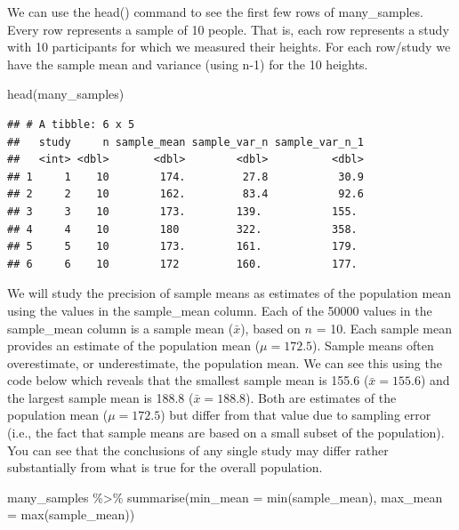 \documentclass[
]{krantz}
\makeatletter
\newenvironment{Shaded}{\begin{snugshade}}{\end{snugshade}}
\newcommand{\AttributeTok}[1]{\textcolor[rgb]{0.61,0.61,0.61}{#1}}
\newcommand{\FunctionTok}[1]{\textcolor[rgb]{0,0,0}{#1}}
\newcommand{\NormalTok}[1]{#1}
\newcommand{\SpecialCharTok}[1]{\textcolor[rgb]{0,0,0}{#1}}
\newenvironment{kframe}{%
\medskip{}
\setlength{\fboxsep}{.8em}
 \def\at@end@of@kframe{}%
 \ifinner\ifhmode%
  \def\at@end@of@kframe{\end{minipage}}%
  \begin{minipage}{\columnwidth}%
 \fi\fi%
 \def\FrameCommand##1{\hskip\@totalleftmargin \hskip-\fboxsep
 \colorbox{shadecolor}{##1}\hskip-\fboxsep
     \hskip-\linewidth \hskip-\@totalleftmargin \hskip\columnwidth}%
 \MakeFramed {\advance\hsize-\width
   \@totalleftmargin\z@ \linewidth\hsize
   \@setminipage}}%
 {\par\unskip\endMakeFramed%
 \at@end@of@kframe}
\renewenvironment{Shaded}{\begin{kframe}}{\end{kframe}}
\makeatother
\begin{document}
We can use the head() command to see the first few rows of many\_samples. Every row represents a sample of 10 people. That is, each row represents a study with 10 participants for which we measured their heights. For each row/study we have the sample mean and variance (using n-1) for the 10 heights.

\begin{Shaded}
\begin{Highlighting}[]
\FunctionTok{head}\NormalTok{(many\_samples)}
\end{Highlighting}
\end{Shaded}

\begin{verbatim}
## # A tibble: 6 x 5
##   study     n sample_mean sample_var_n sample_var_n_1
##   <int> <dbl>       <dbl>        <dbl>          <dbl>
## 1     1    10        174.         27.8           30.9
## 2     2    10        162.         83.4           92.6
## 3     3    10        173.        139.           155. 
## 4     4    10        180         322.           358. 
## 5     5    10        173.        161.           179. 
## 6     6    10        172         160.           177.
\end{verbatim}

We will study the precision of sample means as estimates of the population mean using the values in the sample\_mean column. Each of the 50000 values in the sample\_mean column is a sample mean (\(\bar{x}\)), based on \(n\) = 10. Each sample mean provides an estimate of the population mean (\(\mu = 172.5\)). Sample means often overestimate, or underestimate, the population mean. We can see this using the code below which reveals that the smallest sample mean is 155.6 (\(\bar{x} = 155.6\)) and the largest sample mean is 188.8 (\(\bar{x} = 188.8\)). Both are estimates of the population mean (\(\mu = 172.5\)) but differ from that value due to sampling error (i.e., the fact that sample means are based on a small subset of the population). You can see that the conclusions of any single study may differ rather substantially from what is true for the overall population.

\begin{Shaded}
\begin{Highlighting}[]
\NormalTok{many\_samples }\SpecialCharTok{\%\textgreater{}\%}
   \FunctionTok{summarise}\NormalTok{(}\AttributeTok{min\_mean =} \FunctionTok{min}\NormalTok{(sample\_mean),}
             \AttributeTok{max\_mean =} \FunctionTok{max}\NormalTok{(sample\_mean))}
\end{Highlighting}
\end{Shaded}
\end{document}
